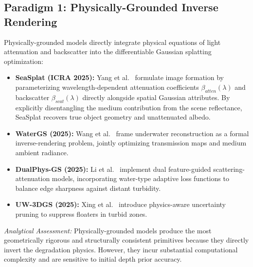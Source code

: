 \subsection{Paradigm 1: Physically-Grounded Inverse Rendering}
Physically-grounded models directly integrate physical equations of light attenuation and backscatter into the differentiable Gaussian splatting optimization:
\begin{itemize}
    \item \textbf{SeaSplat (ICRA 2025):} Yang et al.~\cite{11128502} formulate image formation by parameterizing wavelength-dependent attenuation coefficients $\beta_{atten}(\lambda)$ and backscatter $\beta_{scat}(\lambda)$ directly alongside spatial Gaussian attributes. By explicitly disentangling the medium contribution from the scene reflectance, SeaSplat recovers true object geometry and unattenuated albedo.
    \item \textbf{WaterGS (2025):} Wang et al.~\cite{article} frame underwater reconstruction as a formal inverse-rendering problem, jointly optimizing transmission maps and medium ambient radiance.
    \item \textbf{DualPhys-GS (2025):} Li et al.~\cite{LI2025104405} implement dual feature-guided scattering-attenuation models, incorporating water-type adaptive loss functions to balance edge sharpness against distant turbidity.
    \item \textbf{UW-3DGS (2025):} Xing et al.~\cite{xing2025uw3dgsunderwater3dreconstruction} introduce physics-aware uncertainty pruning to suppress floaters in turbid zones.
\end{itemize}
\textit{Analytical Assessment:} Physically-grounded models produce the most geometrically rigorous and structurally consistent primitives because they directly invert the degradation physics. However, they incur substantial computational complexity and are sensitive to initial depth prior accuracy.

